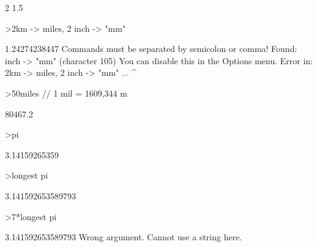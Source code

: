 \documentclass[12pt,Times new roman,letterpaper]{book}
\begin{document}
\begin{eulernootebook}
\begin{eulercomment}
\begin{eulercomment}
\begin{euleroutput}
  2
  1.5
\end{euleroutput}
\begin{eulerprompt}
>2km -> miles, 2 inch -> "mm"
\end{eulerprompt}
\begin{euleroutput}
  1.24274238447
  Commands must be separated by semicolon or comma!
  Found: inch -> "mm" (character 105)
  You can disable this in the Options menu.
  Error in:
  2km -> miles, 2 inch -> "mm" ...
                  ^
\end{euleroutput}
\begin{eulerprompt}
>50miles // 1 mil = 1609,344 m
\end{eulerprompt}
\begin{euleroutput}
  80467.2
\end{euleroutput}
\begin{eulerprompt}
>pi
\end{eulerprompt}
\begin{euleroutput}
  3.14159265359
\end{euleroutput}
\begin{eulerprompt}
>longest pi
\end{eulerprompt}
\begin{euleroutput}
        3.141592653589793 
\end{euleroutput}
\begin{eulerprompt}
>7*longest pi
\end{eulerprompt}
\begin{euleroutput}
        3.141592653589793 
  Wrong argument.
  Cannot use a string here.
  

\end{euleroutput}
\end{eulercomment}
\end{eulercomment}
\end{eulernootebook}
\end{document}
